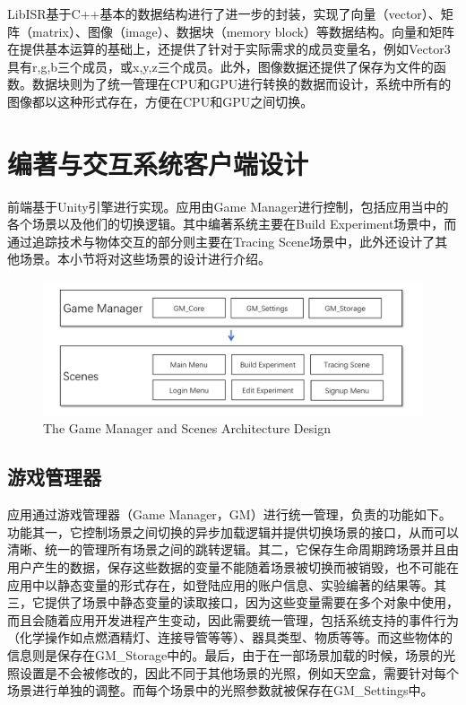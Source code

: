 LibISR基于C++基本的数据结构进行了进一步的封装，实现了向量（vector）、矩阵（matrix）、图像（image）、数据块（memory block）等数据结构。向量和矩阵在提供基本运算的基础上，还提供了针对于实际需求的成员变量名，例如Vector3具有r,g,b三个成员，或x,y,z三个成员。此外，图像数据还提供了保存为文件的函数。数据块则为了统一管理在CPU和GPU进行转换的数据而设计，系统中所有的图像都以这种形式存在，方便在CPU和GPU之间切换。

\section{编著与交互系统客户端设计}
前端基于Unity引擎进行实现。应用由Game Manager进行控制，包括应用当中的各个场景以及他们的切换逻辑。其中编著系统主要在Build Experiment场景中，而通过追踪技术与物体交互的部分则主要在Tracing Scene场景中，此外还设计了其他场景。本小节将对这些场景的设计进行介绍。

\begin{figure}[!htp]
  \centering
  \includegraphics[width=12cm]{figure/GMarc.png}
    {The Game Manager and Scenes Architecture Design}
 \label{fig:gm}
\end{figure}

\subsection{游戏管理器}
应用通过游戏管理器（Game Manager，GM）进行统一管理，负责的功能如下。
功能其一，它控制场景之间切换的异步加载逻辑并提供切换场景的接口，从而可以清晰、统一的管理所有场景之间的跳转逻辑。其二，它保存生命周期跨场景并且由用户产生的数据，保存这些数据的变量不能随着场景被切换而被销毁，也不可能在应用中以静态变量的形式存在，如登陆应用的账户信息、实验编著的结果等。其三，它提供了场景中静态变量的读取接口，因为这些变量需要在多个对象中使用，而且会随着应用开发进程产生变动，因此需要统一管理，包括系统支持的事件行为（化学操作如点燃酒精灯、连接导管等等）、器具类型、物质等等。而这些物体的信息则是保存在GM\_Storage中的。最后，由于在一部场景加载的时候，场景的光照设置是不会被修改的，因此不同于其他场景的光照，例如天空盒，需要针对每个场景进行单独的调整。而每个场景中的光照参数就被保存在GM\_Settings中。

